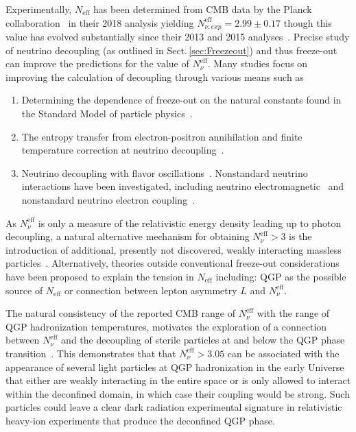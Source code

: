 \documentclass[universe,article,submit,moreauthors,pdftex,a4paper]{Definitions/mdpi}
\newcommand*{\rsec}[1]{Sect.\,{\ref{#1}}}
\begin{document}
Experimentally, $N_\mathrm{eff}$ has been determined from CMB data by the Planck collaboration~\cite{Planck:2018vyg} in their 2018 analysis yielding $N_{\nu, exp}^{\mathrm{eff}}=2.99\pm0.17$ though this value has evolved substantially since their 2013 and 2015 analyses~\cite{Planck:2013pxb,Planck:2015fie}. Precise study of neutrino decoupling (as outlined in \rsec{sec:Freezeout}) and thus freeze-out can improve the predictions for the value of $N_\nu^{\mathrm{eff}}$. Many studies focus on improving the calculation of decoupling through various means such as
\begin{enumerate}
    \item Determining the dependence of freeze-out on the natural constants found in the Standard Model of particle physics~\cite{Birrell:2014uka,Birrell:2014ona}.
    \item The entropy transfer from electron-positron annihilation and finite temperature correction at neutrino decoupling~\cite{Dicus:1982bz,Heckler:1994tv,Fornengo:1997wa}.
    \item Neutrino decoupling with flavor oscillations~\cite{Mangano:2001iu,Mangano:2005cc}. Nonstandard neutrino interactions have been investigated, including neutrino electromagnetic~\cite{Morgan:1981zy,Fukugita:1987uy,Elmfors:1997tt,Vogel:1989iv,Mangano:2006ar,Giunti:2008ve} and nonstandard neutrino electron coupling~\cite{Mangano:2006ar}.
\end{enumerate}
As $N_\nu^\mathrm{eff}$ is only a measure of the relativistic energy density leading up to photon decoupling, a natural alternative mechanism for obtaining $N_\nu^\mathrm{eff}>3$ is the introduction of additional, presently not discovered, weakly interacting massless particles~\cite{Anchordoqui:2011nh,Abazajian:2012ys,Anchordoqui:2012qu,Steigman:2013yua,Giusarma:2014zza}. Alternatively, theories outside conventional freeze-out considerations have been proposed to explain the tension in $N_\mathrm{eff}$ including: QGP as the possible source of $N_\mathrm{eff}$ or connection between lepton asymmetry $L$ and $N_\nu^{\mathrm{eff}}$.

The natural consistency of the reported CMB range of $N_\nu^{\mathrm{eff}}$ with the range of QGP hadronization temperatures, motivates the exploration of a connection between $N_\nu^{\mathrm{eff}}$ and the decoupling of sterile particles at and below the QGP phase transition~\cite{Birrell:2014cja}. This demonstrates that that $N_\nu^{\mathrm{eff}}>3.05$ can be associated with the appearance of several light particles at QGP hadronization in the early Universe that either are weakly interacting in the entire space or is only allowed to interact within the deconfined domain, in which case their coupling would be strong. Such particles could leave a clear dark radiation experimental signature in relativistic heavy-ion experiments that produce the deconfined QGP phase.
\end{document}
